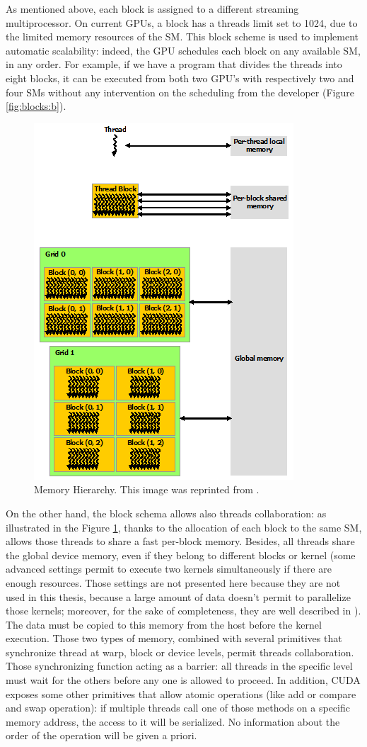 As mentioned above, each block is assigned to a different streaming multiprocessor. On current GPUs, a block has a threads limit set to 1024, due to the limited memory resources of the SM. This block scheme is used to implement automatic scalability: indeed, the GPU schedules each block on any available SM, in any order. For example, if we have a program that divides the threads into eight blocks, it can be executed from both two GPU's with respectively two and four SMs without any intervention on the scheduling from the developer (Figure \ref{fig:blocks:b}).
\begin{figure}[h]
	\centering
	\includegraphics[width=0.6\linewidth]{0-resources/memory-hierarchy}
	\caption{Memory Hierarchy. This image was reprinted from \cite{cuda_manual}.}
	\label{fig:memory-hierarchy}
\end{figure}
On the other hand, the block schema allows also threads collaboration: as illustrated in the Figure \ref{fig:memory-hierarchy}, thanks to the allocation of each block to the same SM, allows those threads to share a fast per-block memory. Besides, all threads share the global device memory, even if they belong to different blocks or kernel (some advanced settings permit to execute two kernels simultaneously if there are enough resources. Those settings are not presented here because they are not used in this thesis, because a large amount of data doesn't permit to parallelize those kernels; moreover, for the sake of completeness, they are well described in \cite{cuda_manual}). The data must be copied to this memory from the host before the kernel execution. Those two types of memory, combined with several primitives that synchronize thread at warp, block or device levels, permit threads collaboration. Those synchronizing function acting as a barrier: all threads in the specific level must wait for the others before any one is allowed to proceed. In addition, CUDA exposes some other primitives that allow atomic operations (like add or compare and swap operation): if multiple threads call one of those methods on a specific memory address, the access to it will be serialized. No information about the order of the operation will be given a priori.

